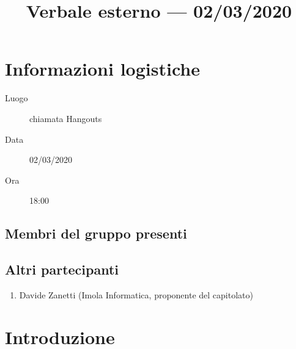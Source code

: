 \documentclass{article}
\title{Verbale esterno --- 02/03/2020}
\begin{document}


\section{Informazioni logistiche}%
\label{sec:informazioni_logistiche}

\begin{description}
  \item [Luogo] chiamata Hangouts
  \item [Data] 02/03/2020
  \item [Ora] 18:00  
\end{description}

\subsection{Membri del gruppo presenti}%
\label{sub:membri_del_gruppo_presenti}



\subsection{Altri partecipanti}%
\label{sub:altri_partecipanti}

\begin{enumerate}
  \item Davide Zanetti (Imola Informatica, proponente del capitolato)
\end{enumerate}


\section{Introduzione}%
\label{sec:introduzione}
\end{document}
